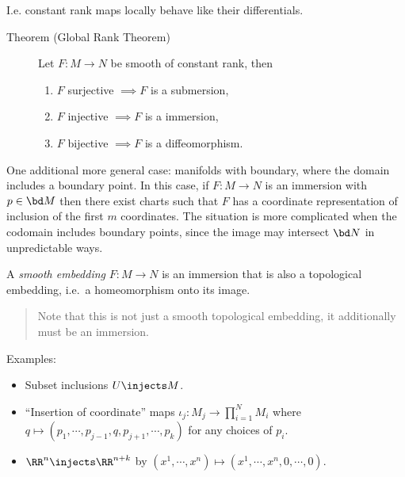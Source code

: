 I.e. constant rank maps locally behave like their differentials.

\begin{description}
\item[Theorem (Global Rank Theorem)]
Let \(F:M \to N\) be smooth of constant rank, then

\begin{enumerate}
\def\labelenumi{\arabic{enumi}.}
\tightlist
\item
  \(F\) surjective \(\implies F\) is a submersion,
\item
  \(F\) injective \(\implies F\) is a immersion,
\item
  \(F\) bijective \(\implies F\) is a diffeomorphism.
\end{enumerate}
\end{description}

One additional more general case: manifolds with boundary, where the
domain includes a boundary point. In this case, if \(F:M\to N\) is an
immersion with \(p\in \bd M\) then there exist charts such that \(F\)
has a coordinate representation of inclusion of the first \(m\)
coordinates. The situation is more complicated when the codomain
includes boundary points, since the image may intersect \(\bd N\) in
unpredictable ways.

\begin{description}
\tightlist
\item[Definition (Embedding)]
A \emph{smooth embedding} \(F:M\to N\) is an immersion that is also a
topological embedding, i.e.~a homeomorphism onto its image.
\end{description}

\begin{quote}
Note that this is not just a smooth topological embedding, it
additionally must be an immersion.
\end{quote}

Examples:

\begin{itemize}
\tightlist
\item
  Subset inclusions \(U \injects M\).
\item
  ``Insertion of coordinate'' maps
  \(\iota_j: M_j \to \prod_{i=1}^N M_i\) where
  \(q \mapsto (p_1, \cdots, p_{j-1}, q, p_{j+1}, \cdots, p_k)\) for any
  choices of \(p_i\).
\item
  \(\RR^n \injects \RR^{n+k}\) by
  \((x^1, \cdots, x^n) \mapsto (x^1, \cdots, x^n, 0, \cdots, 0)\).
\end{itemize}

